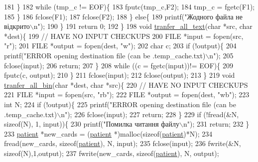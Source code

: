 \begin{DoxyCodeInclude}
{{{{{181         \}
182         \textcolor{keywordflow}{while} (tmp\_c != EOF)\{
183             fputc(tmp\_c,F2);
184             tmp\_c = fgetc(F1);
185         \}
186         fclose(F1);
187         fclose(F2);
188     \} \textcolor{keywordflow}{else}\{
189         printf(\textcolor{stringliteral}{"Жодного файла не відкрито\(\backslash\)n"});
190     \}
191     \textcolor{keywordflow}{return} 0;
192 \}
198 \textcolor{keywordtype}{void} \hyperlink{main_8c_a2d8c16830ee01715bd19345746ffb070}{tranfer\_all\_text}(\textcolor{keywordtype}{char} *src, \textcolor{keywordtype}{char} *dest)\{
199     \textcolor{comment}{// HAVE NO INPUT CHECKUPS}
200     FILE *input = fopen(src, \textcolor{stringliteral}{"r"});
201     FILE *output = fopen(dest, \textcolor{stringliteral}{"w"});
202     \textcolor{keywordtype}{char} c;
203     \textcolor{keywordflow}{if} (!output)\{
204         printf(\textcolor{stringliteral}{"ERROR opening destination file (can be .temp\_cache.txt)\(\backslash\)n"});
205         fclose(input);
206         \textcolor{keywordflow}{return};
207     \}
208     \textcolor{keywordflow}{while} ((c = fgetc(input))!= EOF)\{
209         fputc(c, output);
210     \}
211     fclose(input);
212     fclose(output);
213 \}
219 \textcolor{keywordtype}{void} \hyperlink{main_8c_a0225750ccc073d7680cae540419b124a}{tranfer\_all\_bin}(\textcolor{keywordtype}{char} *dest, \textcolor{keywordtype}{char} *src)\{
220     \textcolor{comment}{// HAVE NO INPUT CHECKUPS}
221     FILE *input = fopen(src, \textcolor{stringliteral}{"rb"});
222     FILE *output = fopen(dest, \textcolor{stringliteral}{"wb"});
223     \textcolor{keywordtype}{int} N;
224     \textcolor{keywordflow}{if} (!output)\{
225         printf(\textcolor{stringliteral}{"ERROR opening destination file (can be .temp\_cache.txt)\(\backslash\)n"});
226         fclose(input);
227         \textcolor{keywordflow}{return};
228     \}
229     \textcolor{keywordflow}{if} (!fread(&N, \textcolor{keyword}{sizeof}(N), 1, input))\{
230         printf(\textcolor{stringliteral}{"Помилка читання файлу\(\backslash\)n"});
231         \textcolor{keywordflow}{return};
232     \}
233     \hyperlink{structpatient__struct}{patient} *new\_cards = (\hyperlink{structpatient__struct}{patient} *)malloc(\textcolor{keyword}{sizeof}(\hyperlink{structpatient__struct}{patient})*N);
234     fread(new\_cards, \textcolor{keyword}{sizeof}(\hyperlink{structpatient__struct}{patient}), N, input);
235     fclose(input);
236     fwrite(&N, \textcolor{keyword}{sizeof}(N),1,output);
237     fwrite(new\_cards, \textcolor{keyword}{sizeof}(\hyperlink{structpatient__struct}{patient}), N, output);
}}}}}
\end{DoxyCodeInclude}
